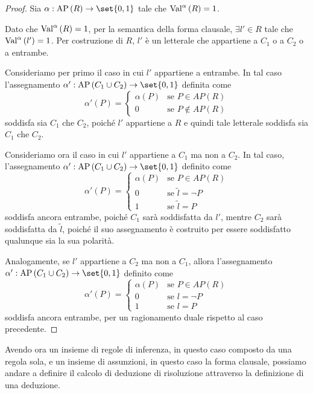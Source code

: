 \begin{proof}
  Sia \(\alpha: \AP[R] \to \set{0,1}\) tale che \(\Val{\alpha}[R] = 1\).

  Dato che \(\Val{\alpha}[R] = 1\), per la semantica della forma clausale, \(\exists l' \in R\) tale che \(\Val{\alpha}[l'] = 1\).
  Per costruzione di \(R\), \(l'\) è un letterale che appartiene a \(C_1\) o a \(C_2\) o a entrambe.

  Consideriamo per primo il caso in cui \(l'\) appartiene a entrambe. In tal caso l'assegnamento \(\alpha': \AP[C_1\cup C_2]\to\set{0,1}\) definita come
  \[\alpha'(P) = \begin{cases}
                \alpha(P) & \text{se } P \in AP(R)\\
                0 & \text{se } P \not\in AP(R) 
              \end{cases}\]
              soddisfa sia \(C_1\) che \(C_2\), poiché \(l'\) appartiene a \(R\) e quindi tale letterale soddisfa sia \(C_1\) che \(C_2\).

  Consideriamo ora il caso in cui \(l'\) appartiene a \(C_1\) ma non a \(C_2\). In tal caso, l'assegnamento \(\alpha': \AP[C_1\cup C_2]\to\set{0,1}\) definito come
  \[\alpha'(P) = \begin{cases}
                \alpha(P) & \text{se } P \in AP(R)\\
                0 & \text{se } \tilde{l} = \neg P\\
                1 & \text{se } \tilde{l} = P
              \end{cases}
  \]
  soddisfa ancora entrambe, poiché \(C_1\) sarà soddisfatta da \(l'\), mentre \(C_2\) sarà soddisfatta da \(\tilde{l}\), poiché il suo assegnamento è costruito per essere soddisfatto qualunque sia la sua polarità.

  Analogamente, se \(l'\) appartiene a \(C_2\) ma non a \(C_1\), allora l'assegnamento \(\alpha': \AP[C_1\cup C_2]\to\set{0,1}\) definito come
  \[\alpha'(P) = \begin{cases}
                \alpha(P) & \text{se } P \in AP(R)\\
                0 & \text{se } l = \neg P\\
                1 & \text{se } l = P
              \end{cases}
  \]
  soddisfa ancora entrambe, per un ragionamento duale rispetto al caso precedente.
\end{proof}

Avendo ora un insieme di regole di inferenza, in questo caso composto da una regola sola, e un insieme di assunzioni, in questo caso la forma clausale, possiamo andare a definire il calcolo di deduzione di risoluzione attraverso la definizione di una deduzione.

